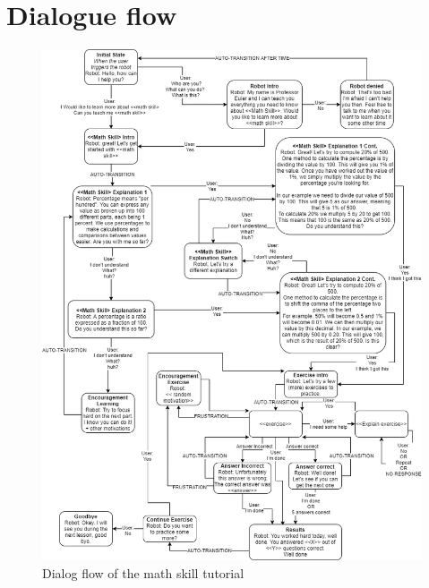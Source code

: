\documentclass[sigconf, nonacm]{acmart}
\begin{document}
\newpage
\section{Dialogue flow}
\label{appendix:b}
\begin{figure}[h]
\includegraphics[width=\linewidth, height=0.9\textheight]{images/DialogFlow.png}
\caption{Dialog flow of the math skill tutorial}

\end{figure}


\end{document}
